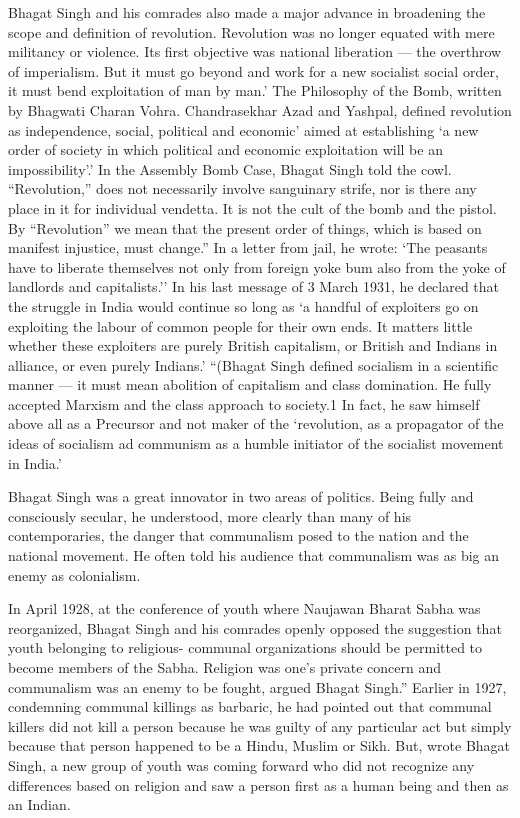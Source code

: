 Bhagat Singh and his comrades also made a major advance in broadening the scope and definition of revolution. Revolution was no longer equated with mere militancy or violence. Its first objective was national liberation --- the overthrow of imperialism. But it must go beyond and work for a new socialist social order, it must bend exploitation of man by man.' The Philosophy of the Bomb, written by Bhagwati Charan Vohra. Chandrasekhar Azad and Yashpal, defined revolution as independence, social, political and economic' aimed at establishing `a new order of society in which political and economic exploitation will be an impossibility'.' In the Assembly Bomb Case, Bhagat Singh told the cowl. ``Revolution,'' does not necessarily involve sanguinary strife, nor is there any place in it for individual vendetta. It is not the cult of the bomb and the pistol. By ``Revolution'' we mean that the present order of things, which is based on manifest injustice, must change.'' In a letter from jail, he wrote: `The peasants have to liberate themselves not only from foreign yoke bum also from the yoke of landlords and capitalists.'' In his last message of 3 March 1931, he declared that the struggle in India would continue so long as `a handful of exploiters go on exploiting the labour of common people for their own ends. It matters little whether these exploiters are purely British capitalism, or British and Indians in alliance, or even purely Indians.' ``(Bhagat Singh defined socialism in a scientific manner --- it must mean abolition of capitalism and class domination. He fully accepted Marxism and the class approach to society.1 In fact, he saw himself above all as a Precursor and not maker of the `revolution, as a propagator of the ideas of socialism ad communism as a humble initiator of the socialist movement in India.'

Bhagat Singh was a great innovator in two areas of politics. Being fully and consciously secular, he understood, more clearly than many of his contemporaries, the danger that communalism posed to the nation and the national movement. He often told his audience that communalism was as big an enemy as colonialism.

In April 1928, at the conference of youth where Naujawan Bharat Sabha was reorganized, Bhagat Singh and his comrades openly opposed the suggestion that youth belonging to religious- communal organizations should be permitted to become members of the Sabha. Religion was one's private concern and communalism was an enemy to be fought, argued Bhagat Singh.'' Earlier in 1927, condemning communal killings as barbaric, he had pointed out that communal killers did not kill a person because he was guilty of any particular act but simply because that person happened to be a Hindu, Muslim or Sikh. But, wrote Bhagat Singh, a new group of youth was coming forward who did not recognize any differences based on religion and saw a person first as a human being and then as an Indian.

